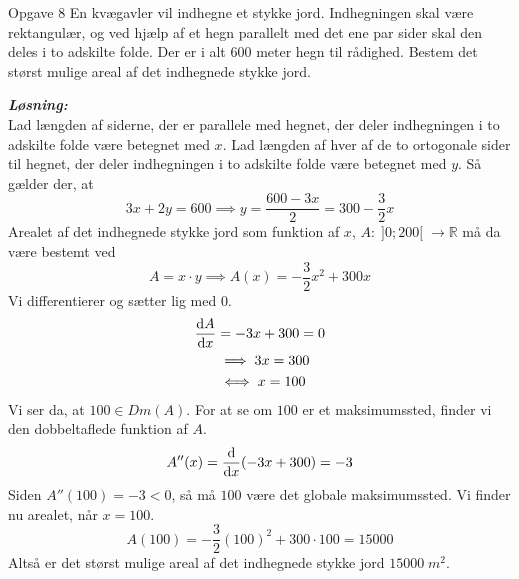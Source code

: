 \documentclass{article}
\newcommand{\sol}{\setlength{\parindent}{0cm}\textbf{\textit{Løsning:}}\setlength{\parindent}{1cm}}
\begin{document}
\begin{question}{Opgave 8}{}
  En kvægavler vil indhegne et stykke jord. Indhegningen skal være rektangulær, og ved hjælp af et hegn parallelt med det ene par sider skal den deles i to adskilte folde.
  Der er i alt $600$ meter hegn til rådighed.
Bestem det størst mulige areal af det indhegnede stykke jord.
\end{question}
\sol \\ 
Lad længden af siderne, der er parallele med hegnet, der deler indhegningen i to adskilte folde være betegnet med $x$.
Lad længden af hver af de to ortogonale sider til hegnet, der deler indhegningen i to adskilte folde være betegnet med $y$.
Så gælder der, at
\[
3x+2y=600 \implies y=\frac{600-3x}{2}=300 - \frac{3}{2} x
\] 
Arealet af det indhegnede stykke jord som funktion af $x$, $A:\;]0;200[\;\to \mathbb{R}$ må da være bestemt ved
\[
A=x\cdot y \implies A(x)=- \frac{3}{2}x^2 + 300x
\] 
Vi differentierer og sætter lig med 0.
\begin{equation*}
\begin{split}
  \dv{A}{x}&=-3x+300=0 \\ 
  &\implies 3x=300 \\ 
  &\iff x=100
\end{split}
\end{equation*}
Vi ser da, at $100 \in Dm(A)$. 
For at se om $100$ er et maksimumssted, finder vi den dobbeltaflede funktion af $A$.
\[
A''(x)=\dv{x} (-3x+300)=-3
\] 
Siden $A''(100)=-3<0$, så må $100$ være det globale maksimumssted. 
Vi finder nu arealet, når $x=100$.
\[
A(100)=- \frac{3}{2}(100)^2 + 300 \cdot 100=15000
\] 
Altså er det størst mulige areal af det indhegnede stykke jord $15000 \;\unit{m}^2 $.
\end{document}
